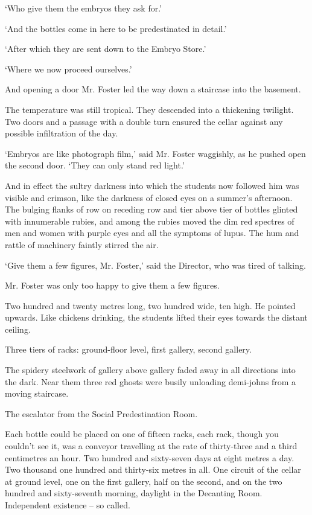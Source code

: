 \documentclass[12pt,a5paper]{book}
\newcommand{\sqm}[1]{‘#1’}
\begin{document}
\sqm{Who give them the embryos they ask for.}

\sqm{And the bottles come in here to be predestinated in detail.}

\sqm{After which they are sent down to the Embryo Store.}

\sqm{Where we now proceed ourselves.}

And opening a door Mr. Foster led the way down a staircase into the basement.

The temperature was still tropical. They descended into a thickening twilight. Two doors and a passage with a double turn ensured the cellar against any possible infiltration of the day.

\sqm{Embryos are like photograph film,} said Mr. Foster waggishly, as he pushed open the second door. \sqm{They can only stand red light.}

And in effect the sultry darkness into which the students now followed him was visible and crimson, like the darkness of closed eyes on a summer's afternoon. The bulging flanks of row on receding row and tier above tier of bottles glinted with innumerable rubies, and among the rubies moved the dim red spectres of men and women with purple eyes and all the symptoms of lupus. The hum and rattle of machinery faintly stirred the air.

\sqm{Give them a few figures, Mr. Foster,} said the Director, who was tired of talking.

Mr. Foster was only too happy to give them a few figures.

Two hundred and twenty metres long, two hundred wide, ten high. He pointed upwards. Like chickens drinking, the students lifted their eyes towards the distant ceiling.

Three tiers of racks: ground-floor level, first gallery, second gallery.

The spidery steelwork of gallery above gallery faded away in all directions into the dark. Near them three red ghosts were busily unloading demi-johns from a moving staircase.

The escalator from the Social Predestination Room.

Each bottle could be placed on one of fifteen racks, each rack, though you couldn't see it, was a conveyor travelling at the rate of thirty-three and a third centimetres an hour. Two hundred and sixty-seven days at eight metres a day. Two thousand one hundred and thirty-six metres in all. One circuit of the cellar at ground level, one on the first gallery, half on the second, and on the two hundred and sixty-seventh morning, daylight in the Decanting Room. Independent existence – so called.
\end{document}
